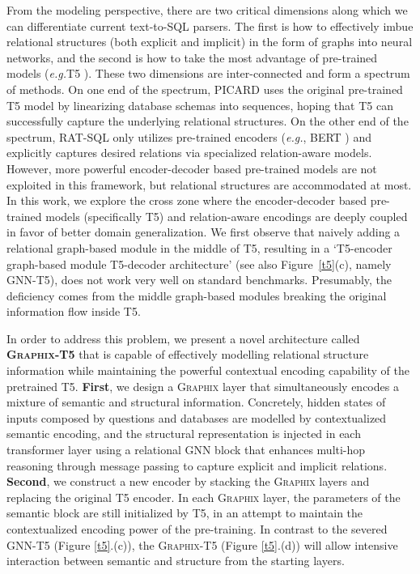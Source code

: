 \documentclass[letterpaper]{article} \usepackage{aaai23}  \usepackage{times}  \usepackage{helvet}  \usepackage{courier}  \usepackage[hyphens]{url}  \usepackage{graphicx} \usepackage{amsmath}
\newcommand{\graphix}{\textsc{Graphix}\xspace}
\def\eg{\emph{e.g.}}
\begin{document}
From the modeling perspective, there are two critical dimensions along which we can differentiate current text-to-SQL parsers. The first is how to effectively imbue relational structures (both explicit and implicit) in the form of graphs into neural networks, and the second is how to take the most advantage of pre-trained models (\eg T5 \citep{t5-jmir-2020}). These two dimensions are inter-connected and form a spectrum of methods. On one end of the spectrum, PICARD \citep{PICARD} uses the original pre-trained T5 model by linearizing database schemas into sequences, hoping that T5 can successfully capture the underlying relational structures. On the other end of the spectrum, RAT-SQL \citep{wang-etal-2020-rat} only utilizes pre-trained encoders (\eg, BERT \citep{devlin-etal-2019-bert})
and explicitly captures desired relations via specialized relation-aware models. However, more powerful encoder-decoder based pre-trained models are not exploited in this framework, but relational structures are accommodated at most. In this work, we explore the cross zone where the encoder-decoder based pre-trained models (specifically T5) and relation-aware encodings are deeply coupled in favor of better domain generalization.
We first observe that naively adding a relational graph-based module in the middle of T5, resulting in a `T5-encoder  graph-based module  T5-decoder architecture' (see also Figure~\ref{t5}(c), namely GNN-T5), does not work very well on standard benchmarks. Presumably, the deficiency comes from the middle graph-based modules breaking the original information flow inside T5.



In order to address this problem, we present a novel architecture called \textbf{\graphix-T5} that is capable of effectively modelling relational structure information while maintaining the powerful contextual encoding capability of the pretrained T5.
\textbf{First}, we design a \graphix layer that simultaneously encodes a mixture of semantic and structural information.
Concretely, hidden states of inputs composed by questions and databases are modelled by contextualized semantic encoding, and the structural representation is injected in each transformer layer using a relational GNN block that enhances multi-hop reasoning through message passing \citep{multi-hop, gat} to capture explicit and implicit relations.
\textbf{Second}, we construct a new encoder by stacking the \graphix layers and replacing the original T5 encoder. In each \graphix layer, the parameters of the semantic block are still initialized by T5, in an attempt to maintain the contextualized encoding power of the pre-training.
In contrast to the severed GNN-T5 (Figure \ref{t5}.(c)), the \graphix-T5 (Figure \ref{t5}.(d)) will allow intensive interaction between semantic and structure from the starting layers.
\end{document}
